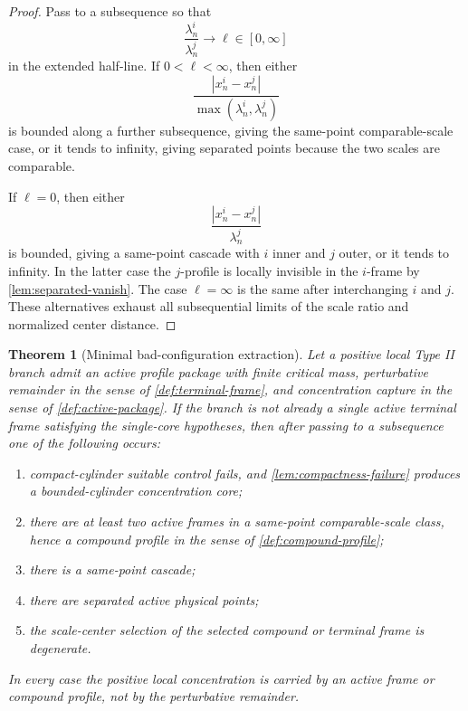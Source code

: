 \documentclass[11pt]{amsart}
\theoremstyle{plain}
\newtheorem{theorem}{Theorem}[section]
\theoremstyle{definition}
\theoremstyle{remark}
\begin{document}
\begin{proof}
Pass to a subsequence so that
\[
  \frac{\lambda^i_n}{\lambda^j_n}\to \ell\in[0,\infty]
\]
in the extended half-line.  If \(0<\ell<\infty\), then either
\[
  \frac{|x^i_n-x^j_n|}{\max(\lambda^i_n,\lambda^j_n)}
\]
is bounded along a further subsequence, giving the same-point comparable-scale
case, or it tends to infinity, giving separated points because the two scales
are comparable.
\par
If \(\ell=0\), then either
\[
  \frac{|x^i_n-x^j_n|}{\lambda^j_n}
\]
is bounded, giving a same-point cascade with \(i\) inner and \(j\) outer, or it
tends to infinity.  In the latter case the \(j\)-profile is locally invisible in
the \(i\)-frame by \cref{lem:separated-vanish}.  The case \(\ell=\infty\) is the
same after interchanging \(i\) and \(j\).  These alternatives exhaust all
subsequential limits of the scale ratio and normalized center distance.
\end{proof}

\begin{theorem}[Minimal bad-configuration extraction]\label{thm:minimal-bad-extraction}
Let a positive local Type II branch admit an active profile package with finite
critical mass, perturbative remainder in the sense of
\cref{def:terminal-frame}, and concentration capture in the sense of
\cref{def:active-package}.  If the branch is not already a single active
terminal frame satisfying the single-core hypotheses, then after passing to a
subsequence one of the following occurs:
\begin{enumerate}[label=\textup{(\roman*)}]
\item compact-cylinder suitable control fails, and
\cref{lem:compactness-failure} produces a bounded-cylinder concentration core;
\item there are at least two active frames in a same-point comparable-scale
class, hence a compound profile in the sense of \cref{def:compound-profile};
\item there is a same-point cascade;
\item there are separated active physical points;
\item the scale-center selection of the selected compound or terminal frame is
degenerate.
\end{enumerate}
In every case the positive local concentration is carried by an active frame or
compound profile, not by the perturbative remainder.
\end{theorem}
\end{document}
